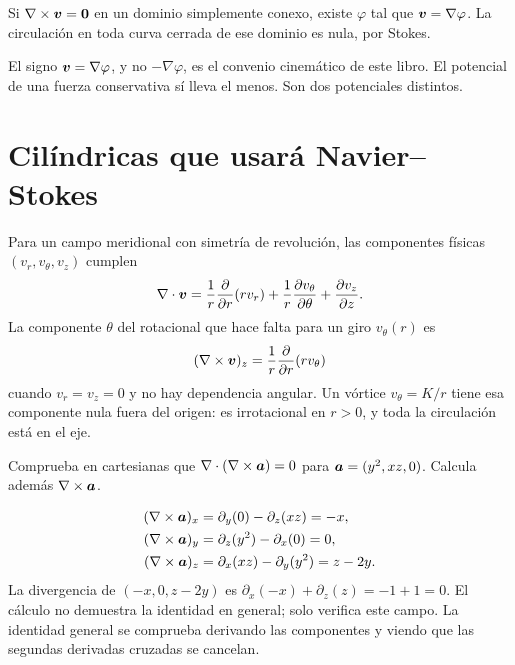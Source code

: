 \begin{theorembox}
Si \(\nabla\times\boldsymbol{v}=\boldsymbol{0}\) en un dominio simplemente conexo, existe \(\varphi\) tal que \(\boldsymbol{v}=\nabla\varphi\). La circulación en toda curva cerrada de ese dominio es nula, por Stokes.
\end{theorembox}

El signo \(\boldsymbol{v}=\nabla\varphi\), y no \(-\nabla\varphi\), es el convenio cinemático de este libro. El potencial de una fuerza conservativa sí lleva el menos. Son dos potenciales distintos.

\section{Cilíndricas que usará Navier--Stokes}

Para un campo meridional con simetría de revolución, las componentes físicas \((v_r,v_\theta,v_z)\) cumplen
\begin{equation}
\label{eq:div-cil}
\nabla\cdot\boldsymbol{v}
=\frac{1}{r}\frac{\partial}{\partial r}(r v_r)+\frac{1}{r}\frac{\partial v_\theta}{\partial\theta}+\frac{\partial v_z}{\partial z}.
\end{equation}
La componente \(\theta\) del rotacional que hace falta para un giro \(v_\theta(r)\) es
\begin{equation}
\label{eq:rot-cil}
(\nabla\times\boldsymbol{v})_z=\frac{1}{r}\frac{\partial}{\partial r}(r v_\theta)
\end{equation}
cuando \(v_r=v_z=0\) y no hay dependencia angular. Un vórtice \(v_\theta=K/r\) tiene esa componente nula fuera del origen: es irrotacional en \(r>0\), y toda la circulación está en el eje.

\begin{problembox}[Básico]
Comprueba en cartesianas que \(\nabla\cdot(\nabla\times\boldsymbol{a})=0\) para \(\boldsymbol{a}=(y^2,xz,0)\). Calcula además \(\nabla\times\boldsymbol{a}\).
\end{problembox}
\begin{solutionbox}
\begin{align*}
(\nabla\times\boldsymbol{a})_x&=\partial_y(0)-\partial_z(xz)=-x,\\
(\nabla\times\boldsymbol{a})_y&=\partial_z(y^2)-\partial_x(0)=0,\\
(\nabla\times\boldsymbol{a})_z&=\partial_x(xz)-\partial_y(y^2)=z-2y.
\end{align*}
La divergencia de \((-x,0,z-2y)\) es \(\partial_x(-x)+\partial_z(z)=-1+1=0\). El cálculo no demuestra la identidad en general; solo verifica este campo. La identidad general se comprueba derivando las componentes y viendo que las segundas derivadas cruzadas se cancelan.
\end{solutionbox}

